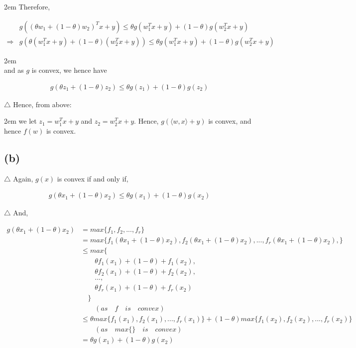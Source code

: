 \documentclass[a4paper,12pt]{article}
\begin{document}
\hangindent2em
\noindent Therefore, 

\begin{align*}
   &g( (\theta w_{1} + (1-\theta) w_{2})^{T}x + y) \leq 
   \theta g(w_{1}^{T}x + y) +  (1-\theta) g(w_{2}^{T}x + y)\\
   \Rightarrow &
   g(\theta (w_{1}^{T}x + y) + (1-\theta) (w_{2}^{T}x + y)) \leq
   \theta g(w_{1}^{T}x + y) +  (1-\theta) g(w_{2}^{T}x + y)
\end{align*}

\hangindent2em
\noindent  \\
and as $g$ is convex,
we hence have

\begin{align*}
   g(\theta z_{1} + (1-\theta) z_{2}) \leq \theta g(z_{1}) + (1-\theta) g(z_{2})
\end{align*}

\noindent $\triangle$ Hence, from above:

\hangindent2em
\noindent  
we let $z_{1} = w_{1}^{T}x + y$ and $z_{2} = w_{2}^{T}x + y$.
Hence, $g(\langle w,x \rangle + y)$ is convex, 
and hence $f(w)$ is convex.

\subsection*{(b)}
\noindent $\triangle$ Again, $g(x)$ is convex if and only if,

\begin{align*}
   g(\theta x_{1} + (1-\theta) x_{2}) \leq 
   \theta g(x_{1}) + (1-\theta) g(x_{2})
\end{align*}

\noindent $\triangle$ And,

\begin{align*}
   g(\theta x_{1} + (1-\theta) x_{2}) 
   &= max \{ f_{1}, f_{2},..., f_{r} \} \\
   &= max \{ 
      f_{1}(\theta x_{1} + (1-\theta) x_{2}),
      f_{2}(\theta x_{1} + (1-\theta) x_{2}),
      ...,
      f_{r}(\theta x_{1} + (1-\theta) x_{2}),
      \} \\
   &\leq max \{ \\
      &\qquad \theta f_{1}(x_{1}) + (1 - \theta) + f_{1}(x_{2}), \\
      &\qquad \theta f_{2}(x_{1}) + (1 - \theta) + f_{2}(x_{2}), \\
      &\qquad..., \\
      &\qquad\theta f_{r}(x_{1}) + (1 - \theta) + f_{r}(x_{2}) \\
      &\quad\}
      \quad \\
      &\qquad(as \quad f \quad is \quad convex) \\
   &\leq \theta max \{f_{1}(x_{1}), f_{2}(x_{1}),...,f_{r}(x_{1})\}
    + (1-\theta) max \{f_{1}(x_{2}), f_{2}(x_{2}),...,f_{r}(x_{2})\} \\
      &\qquad(as \quad max\{\} \quad is \quad convex) \\   
   &= \theta g(x_{1}) + (1-\theta)g(x_{2})
\end{align*}
\end{document}
